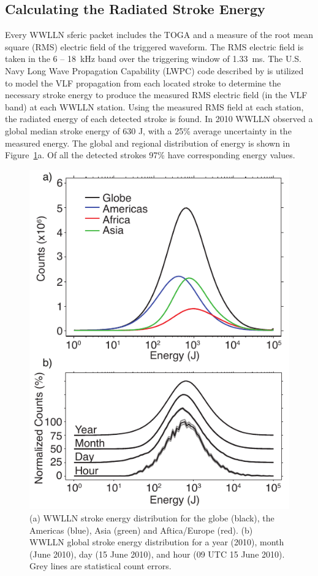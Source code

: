 \subsection{Calculating the Radiated Stroke Energy}

Every WWLLN sferic packet includes the TOGA and a measure of the root mean square (RMS) electric field of the triggered waveform.
The RMS electric field is taken in the 6 -- 18~kHz band over the triggering window of 1.33~ms.
The U.S. Navy Long Wave Propagation Capability (LWPC) code described by \citet{Ferguson1998} is utilized to model the VLF propagation from each located stroke to determine the necessary stroke energy to produce the measured RMS electric field (in the VLF band) at each WWLLN station.
Using the measured RMS field at each station, the radiated energy of each detected stroke is found.
In 2010 WWLLN observed a global median stroke energy of 630 J, with a 25\% average uncertainty in the measured energy.
The global and regional distribution of energy is shown in Figure~\ref{efficiency:fig:2010_Energy}a.
Of all the detected strokes 97\% have corresponding energy values.
\citep{Hutchins2012}

\begin{figure}[ht!]
   \centering
\noindent\includegraphics[scale=1]{efficiency/Figures/2012RS005049-p1.pdf}
   \caption{(a) WWLLN stroke energy distribution for the globe (black), the Americas (blue), Asia (green) and Aftica/Europe (red).
(b) WWLLN global stroke energy distribution for a year (2010), month (June 2010), day (15 June 2010), and hour (09 UTC 15 June 2010).
Grey lines are statistical count errors.}
   \label{efficiency:fig:2010_Energy}
\end{figure}

